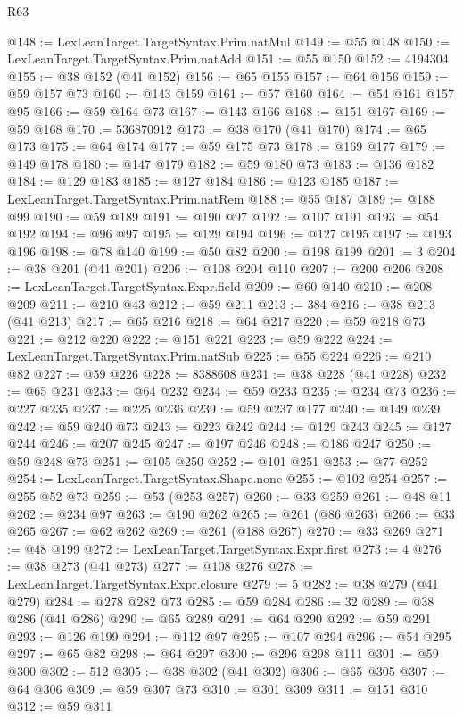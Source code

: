 \begin{lexlean}{R63}
\begin{coremodule}
@148 := LexLeanTarget.TargetSyntax.Prim.natMul
@149 := @55 @148
@150 := LexLeanTarget.TargetSyntax.Prim.natAdd
@151 := @55 @150
@152 := 4194304
@155 := @38 @152 (@41 @152)
@156 := @65 @155
@157 := @64 @156
@159 := @59 @157 @73
@160 := @143 @159
@161 := @57 @160
@164 := @54 @161 @157 @95
@166 := @59 @164 @73
@167 := @143 @166
@168 := @151 @167
@169 := @59 @168
@170 := 536870912
@173 := @38 @170 (@41 @170)
@174 := @65 @173
@175 := @64 @174
@177 := @59 @175 @73
@178 := @169 @177
@179 := @149 @178
@180 := @147 @179
@182 := @59 @180 @73
@183 := @136 @182
@184 := @129 @183
@185 := @127 @184
@186 := @123 @185
@187 := LexLeanTarget.TargetSyntax.Prim.natRem
@188 := @55 @187
@189 := @188 @99
@190 := @59 @189
@191 := @190 @97
@192 := @107 @191
@193 := @54 @192
@194 := @96 @97
@195 := @129 @194
@196 := @127 @195
@197 := @193 @196
@198 := @78 @140
@199 := @50 @82
@200 := @198 @199
@201 := 3
@204 := @38 @201 (@41 @201)
@206 := @108 @204 @110
@207 := @200 @206
@208 := LexLeanTarget.TargetSyntax.Expr.field
@209 := @60 @140
@210 := @208 @209
@211 := @210 @43
@212 := @59 @211
@213 := 384
@216 := @38 @213 (@41 @213)
@217 := @65 @216
@218 := @64 @217
@220 := @59 @218 @73
@221 := @212 @220
@222 := @151 @221
@223 := @59 @222
@224 := LexLeanTarget.TargetSyntax.Prim.natSub
@225 := @55 @224
@226 := @210 @82
@227 := @59 @226
@228 := 8388608
@231 := @38 @228 (@41 @228)
@232 := @65 @231
@233 := @64 @232
@234 := @59 @233
@235 := @234 @73
@236 := @227 @235
@237 := @225 @236
@239 := @59 @237 @177
@240 := @149 @239
@242 := @59 @240 @73
@243 := @223 @242
@244 := @129 @243
@245 := @127 @244
@246 := @207 @245
@247 := @197 @246
@248 := @186 @247
@250 := @59 @248 @73
@251 := @105 @250
@252 := @101 @251
@253 := @77 @252
@254 := LexLeanTarget.TargetSyntax.Shape.none
@255 := @102 @254
@257 := @255 @52 @73
@259 := @53 (@253 @257)
@260 := @33 @259
@261 := @48 @11
@262 := @234 @97
@263 := @190 @262
@265 := @261 (@86 @263)
@266 := @33 @265
@267 := @62 @262
@269 := @261 (@188 @267)
@270 := @33 @269
@271 := @48 @199
@272 := LexLeanTarget.TargetSyntax.Expr.first
@273 := 4
@276 := @38 @273 (@41 @273)
@277 := @108 @276
@278 := LexLeanTarget.TargetSyntax.Expr.closure
@279 := 5
@282 := @38 @279 (@41 @279)
@284 := @278 @282 @73
@285 := @59 @284
@286 := 32
@289 := @38 @286 (@41 @286)
@290 := @65 @289
@291 := @64 @290
@292 := @59 @291
@293 := @126 @199
@294 := @112 @97
@295 := @107 @294
@296 := @54 @295
@297 := @65 @82
@298 := @64 @297
@300 := @296 @298 @111
@301 := @59 @300
@302 := 512
@305 := @38 @302 (@41 @302)
@306 := @65 @305
@307 := @64 @306
@309 := @59 @307 @73
@310 := @301 @309
@311 := @151 @310
@312 := @59 @311

\end{coremodule}
\end{lexlean}
